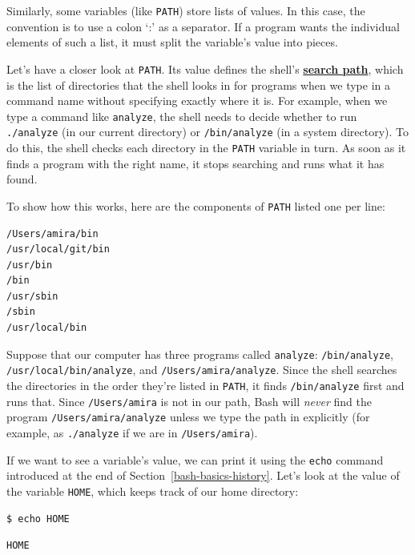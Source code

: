 \documentclass[
]{krantz}
\newcommand{\gref}[2]{\hyperlink{#2}{\textbf{#1}}}
\begin{document}
Similarly, some variables (like \texttt{PATH}) store lists of values.
In this case, the convention is to use a colon `:' as a separator.
If a program wants the individual elements of such a list,
it must split the variable's value into pieces.

Let's have a closer look at \texttt{PATH}.
Its value defines the shell's \gref{search path}{search\_path},
which is the list of directories that the shell looks in for programs
when we type in a command name without specifying exactly where it is.
For example,
when we type a command like \texttt{analyze},
the shell needs to decide whether to run \texttt{./analyze} (in our current directory)
or \texttt{/bin/analyze} (in a system directory).
To do this,
the shell checks each directory in the \texttt{PATH} variable in turn.
As soon as it finds a program with the right name,
it stops searching and runs what it has found.

To show how this works,
here are the components of \texttt{PATH} listed one per line:

\begin{verbatim}
/Users/amira/bin
/usr/local/git/bin
/usr/bin
/bin
/usr/sbin
/sbin
/usr/local/bin
\end{verbatim}

Suppose that our computer has three programs called \texttt{analyze}:
\texttt{/bin/analyze},
\texttt{/usr/local/bin/analyze},
and \texttt{/Users/amira/analyze}.
Since the shell searches the directories in the order they're listed in \texttt{PATH},
it finds \texttt{/bin/analyze} first and runs that.
Since \texttt{/Users/amira} is not in our path,
Bash will \emph{never} find the program \texttt{/Users/amira/analyze}
unless we type the path in explicitly
(for example,
as \texttt{./analyze} if we are in \texttt{/Users/amira}).

If we want to see a variable's value,
we can print it using the \texttt{echo} command
introduced at the end of Section~\ref{bash-basics-history}.
Let's look at the value of the variable \texttt{HOME},
which keeps track of our home directory:

\begin{verbatim}
$ echo HOME
\end{verbatim}

\begin{verbatim}
HOME
\end{verbatim}
\end{document}
